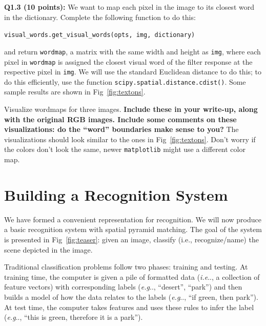 \documentclass[10pt]{article}
\makeatletter
\DeclareRobustCommand\onedot{\futurelet\@let@token\@onedot}
\def\@onedot{\ifx\@let@token.\else.\null\fi\xspace}
\def\eg{\emph{e.g}\onedot} \def\Eg{\emph{E.g}\onedot}
\def\ie{\emph{i.e}\onedot} \def\Ie{\emph{I.e}\onedot}
\makeatother
\begin{document}
{\bf Q1.3 (10 points):}
We want to map each pixel in the image to its closest word in the dictionary.
Complete the following function to do this:
\begin{center}
{\tt visual\_words.get\_visual\_words(opts, img, dictionary)}
\end{center}
and return {\tt wordmap}, a matrix with the same width and height as {\tt img}, where each pixel in {\tt wordmap} is assigned the closest visual word of the filter response at the respective pixel in {\tt img}. We will use the standard Euclidean distance to do this; to do this efficiently, use the function {\tt scipy.spatial.distance.cdist()}. Some sample results are shown in Fig~\ref{fig:textons}.


Visualize wordmaps for three images. {\bf Include these in your write-up, along with the original RGB images. Include some comments on these visualizations: do the ``word'' boundaries make sense to you?} The visualizations should look similar to the ones in Fig~\ref{fig:textons}. Don't worry if the colors don't look the same, newer {\tt matplotlib} might use a different color map.

\section{Building a Recognition System}
\label{sec:img_recog}
We have formed a convenient representation for recognition. We will now
produce a basic recognition system with spatial pyramid matching. The goal of the system is presented in Fig~\ref{fig:teaser}:
given an image, classify (i.e., recognize/name) the scene depicted in the image.

Traditional classification problems follow two phases: training and testing.
At training time, the computer is given a pile of formatted data (\ie, a collection
of feature vectors) with corresponding labels (\eg, ``desert'', ``park'') and
then builds a model of how the data relates to the labels (\eg, ``if green, then park''). At test time, the computer takes features and uses these rules to infer the label (\eg, ``this is green, therefore it is a park'').
\end{document}
